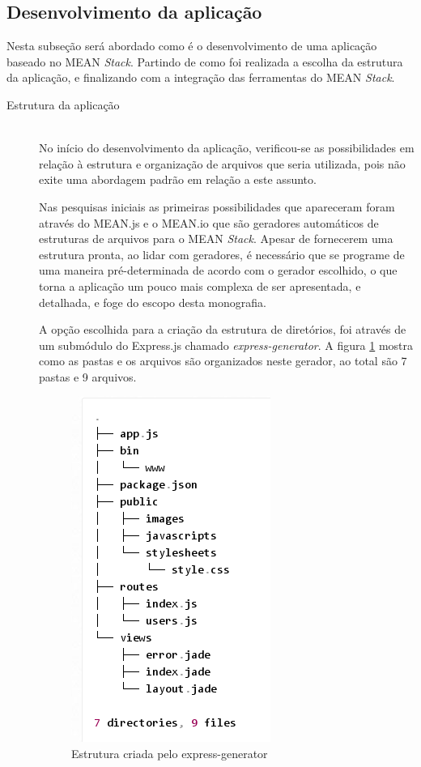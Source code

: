 \subsection{Desenvolvimento da aplicação}
\label{subsec: Desenvolvimento da aplicação}
Nesta subseção será abordado como é o desenvolvimento de uma aplicação baseado no MEAN \textit{Stack}. Partindo de como foi realizada a escolha da estrutura da aplicação, e finalizando com a integração das ferramentas do MEAN \textit{Stack}.
\begin{description}
\item[Estrutura da aplicação] \hfill \\
No início do desenvolvimento da aplicação, verificou-se as possibilidades em relação à estrutura e organização de arquivos que seria utilizada, pois não exite uma abordagem padrão em relação a este assunto.

Nas pesquisas iniciais as primeiras possibilidades que apareceram foram através do MEAN.js e o MEAN.io que são geradores automáticos de estruturas de arquivos para o MEAN \textit{Stack}. Apesar de fornecerem uma estrutura pronta, ao lidar com geradores, é necessário que se programe de uma maneira pré-determinada de acordo com o gerador escolhido, o que torna a aplicação um pouco mais complexa de ser apresentada, e detalhada, e foge do escopo desta monografia.

A opção escolhida para a criação da estrutura de diretórios, foi através de um submódulo do Express.js chamado \textit{express-generator}. A figura \ref{fig: estrutura criada pelo express-generator} mostra como as pastas e os arquivos são organizados neste gerador, ao total são 7 pastas e 9 arquivos. 

    \begin{figure}[htb]
    \centering
    \includegraphics[scale=0.7]{images/estrutura_exp_gen.png}
    \caption{Estrutura criada pelo express-generator \cite{ExpressGen}}
    \label{fig: estrutura criada pelo express-generator}
    \end{figure}


\end{description}
